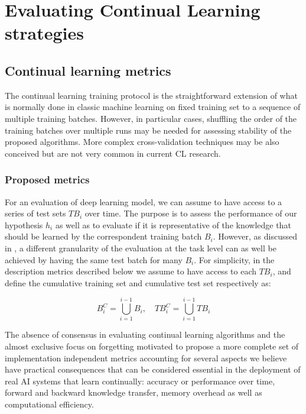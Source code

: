 \documentclass[english, LaM, oneside]{sapthesis}%
\begin{document}
\part{Evaluating Continual Learning strategies}

\chapter{Continual learning metrics}
The continual learning training protocol is the straightforward extension of what is normally done in classic machine learning on fixed training set to a sequence of multiple training batches. However, in particular cases, shuffling the order of the training batches over multiple runs may be needed for assessing stability of the proposed algorithms. More complex cross-validation techniques may be also conceived but are not very common in current CL research.
\section{Proposed metrics}
For an evaluation of deep learning model, we can assume to have access to a series of test sets $T B_i$ over time. The purpose is to assess the performance of our hypothesis $h_i$ as well as to evaluate if it is representative of the knowledge that should be learned by the correspondent training batch $B_i$.
However, as discussed in \cite{lopez}, a different granularity of the evaluation at the task level can as well be achieved by having the same test batch for many $B_i$. For simplicity, in the description metrics described below we assume to have access to each $T B_i$, and define the cumulative training set and cumulative test set respectively as:

\begin{equation}
                B_i^C = \bigcup_{i=1}^{i-1}{B_i}, \quad   T B_i^C = \bigcup_{i=1}^{i-1}{T B_i}
\end{equation}
\vspace{5mm}

The absence of consensus in evaluating continual learning algorithms and the almost exclusive focus on forgetting motivated to propose a more complete set of implementation independent metrics accounting for several aspects we believe have practical consequences that can be considered essential in the deployment of real AI systems that learn continually: accuracy or performance over time, forward and backward knowledge transfer, memory overhead as well as computational efficiency.
\vspace{5mm}
\end{document}
